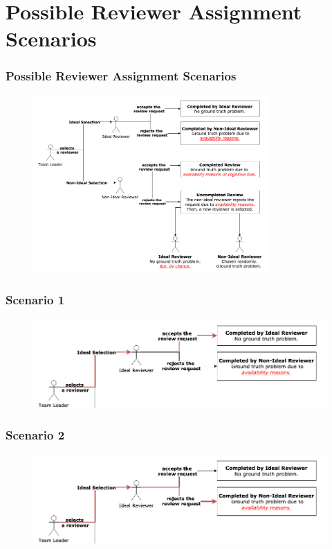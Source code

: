 \documentclass{beamer}
\begin{document}
\iffalse
\section{Possible Reviewer Assignment Scenarios}
\begin{frame}
\frametitle{\large Possible Reviewer Assignment Scenarios}
      \begin{figure}
      \includegraphics[width=0.8\textwidth]{img/scenarios_all.png}
      \end{figure}
\end{frame}
\begin{frame}
\frametitle{\large Scenario 1}
      \begin{figure}
      \includegraphics[width=1.05\textwidth]{img/scenarios_1.png}
      \end{figure}
\end{frame}
\begin{frame}
\frametitle{\large Scenario 2}
      \begin{figure}
      \includegraphics[width=1.05\textwidth]{img/scenarios_2.png}
      \end{figure}
\end{frame}
\end{document}
